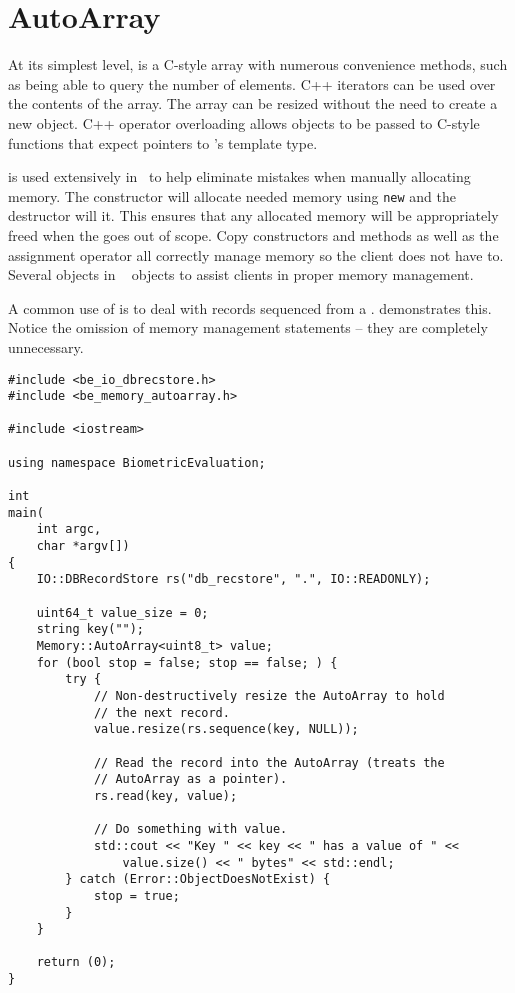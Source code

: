 \section{AutoArray}
\label{sec-autoarray}
At its simplest level,  is a C-style array with numerous convenience 
methods, such as being able to query the number of elements.  C++ iterators
can be used over the contents of the array.  The array can be resized without
the need to create a new object.  C++ operator overloading allows 
objects to be passed to C-style functions that expect pointers to 's
template type.

 is used extensively in \sname\ to help eliminate mistakes when
manually allocating memory.  The  constructor will allocate needed
memory using {\tt new} and the destructor will  it.  This ensures
that any allocated memory will be appropriately freed when the  goes
out of scope.  Copy constructors and methods as well as the assignment operator
all correctly manage memory so the client does not have to.  Several objects in
\sname\   objects to assist clients in proper memory management.

A common use of  is to deal with records sequenced from a
.  demonstrates this.  Notice the
omission of memory management statements -- they are completely unnecessary.

\begin{lstlisting}[caption={Using \class{AutoArray}s with \class{RecordStore}s}, label=autoarrayrsuse]
#include <be_io_dbrecstore.h>
#include <be_memory_autoarray.h>

#include <iostream>

using namespace BiometricEvaluation;

int
main(
    int argc,
    char *argv[])
{
	IO::DBRecordStore rs("db_recstore", ".", IO::READONLY);

	uint64_t value_size = 0;
	string key("");
	Memory::AutoArray<uint8_t> value;
	for (bool stop = false; stop == false; ) {
		try {
			// Non-destructively resize the AutoArray to hold
			// the next record.
			value.resize(rs.sequence(key, NULL));

			// Read the record into the AutoArray (treats the
			// AutoArray as a pointer).
			rs.read(key, value);

			// Do something with value.
			std::cout << "Key " << key << " has a value of " <<
			    value.size() << " bytes" << std::endl;
		} catch (Error::ObjectDoesNotExist) {
			stop = true;
		}
	}

	return (0);
}
\end{lstlisting}

